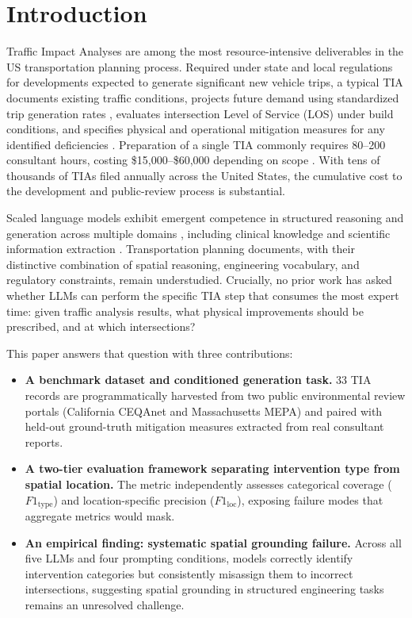 \documentclass[preprint,12pt]{elsarticle}
\begin{document}
\section{Introduction}
\label{sec:intro}

Traffic Impact Analyses are among the most resource-intensive deliverables in
the US transportation planning process.
Required under state and local regulations for developments expected to generate
significant new vehicle trips, a typical TIA documents existing traffic conditions,
projects future demand using standardized trip generation rates
\citep{ITE2021}, evaluates intersection Level of Service (LOS) under build
conditions, and specifies physical and operational mitigation measures for any
identified deficiencies \citep{NCHRP2019}.
Preparation of a single TIA commonly requires 80--200 consultant hours, costing
\$15{,}000--\$60{,}000 depending on scope \citep[see, e.g.,][]{FHWA2014}.
With tens of thousands of TIAs filed annually across the United States, the
cumulative cost to the development and public-review process is substantial.

Scaled language models exhibit emergent competence in structured reasoning
and generation across multiple domains \citep{brown2020gpt3, wei2022emergent,
openai2023gpt4, bubeck2023sparks}, including clinical knowledge
\citep{MedicalLLM2023} and scientific information extraction
\citep{ScienceLLM2023}.
Transportation planning documents, with their distinctive combination of
spatial reasoning, engineering vocabulary, and regulatory constraints,
remain understudied.
Crucially, no prior work has asked whether LLMs can perform the specific TIA
step that consumes the most expert time: given traffic analysis results, what
physical improvements should be prescribed, and at which intersections?

This paper answers that question with three contributions:

\begin{itemize}
\item \textbf{A benchmark dataset and conditioned generation task.}
33 TIA records are programmatically harvested from two public environmental
review portals (California CEQAnet and Massachusetts MEPA) and paired with
held-out ground-truth mitigation measures extracted from real consultant reports.

\item \textbf{A two-tier evaluation framework separating intervention type
from spatial location.}
The metric independently assesses categorical coverage ($F1_\text{type}$)
and location-specific precision ($F1_\text{loc}$), exposing failure modes
that aggregate metrics would mask.

\item \textbf{An empirical finding: systematic spatial grounding failure.}
Across all five LLMs and four prompting conditions, models correctly
identify intervention categories but consistently misassign them to
incorrect intersections, suggesting spatial grounding in structured engineering
tasks remains an unresolved challenge.
\end{itemize}
\end{document}
